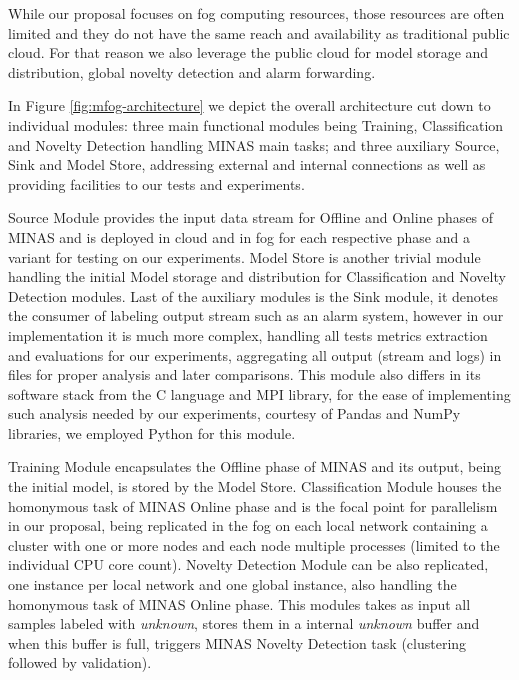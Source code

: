 
While our proposal focuses on fog computing resources, those resources are often limited
and they do not have the same reach and availability as traditional public cloud.
For that reason we also leverage the public cloud for model storage and distribution,
global novelty detection and alarm forwarding.

In Figure \ref{fig:mfog-architecture} we depict the overall architecture cut down to
individual modules:
three main functional modules being Training, Classification
and Novelty Detection handling MINAS main tasks;
and three auxiliary Source, Sink and Model Store, addressing external and internal connections
as well as providing facilities to our tests and experiments.


Source Module provides the input data stream for Offline and Online phases of MINAS
and is deployed in cloud and in fog for each respective phase and a variant for
testing on our experiments.
Model Store is another trivial module handling the initial Model storage and distribution
for Classification and Novelty Detection modules.
Last of the auxiliary modules is the Sink module, it denotes the consumer of labeling
output stream such as an alarm system, however in our implementation it is much more
complex, handling all tests metrics extraction and evaluations for our experiments,
aggregating all output (stream and logs) in files for proper analysis and later comparisons.
This module also differs in its software stack from the C language and MPI library,
for the ease of implementing such analysis needed by our experiments, 
courtesy of Pandas and NumPy libraries, we employed Python for this module.


Training Module encapsulates the Offline phase of MINAS and its output, being the
initial model, is stored by the Model Store.
Classification Module houses the homonymous task of MINAS Online phase and
is the focal point for parallelism in our proposal,
being replicated in the fog on each local network containing a cluster with one
or more nodes and each node multiple processes (limited to the individual CPU core count).
Novelty Detection Module can be also replicated,
one instance per local network and one global instance,
also handling the homonymous task of MINAS Online phase.
This modules takes as input all samples labeled with \emph{unknown},
stores them in a internal \emph{unknown} buffer and when this buffer is full,
triggers MINAS Novelty Detection task (clustering followed by validation).

